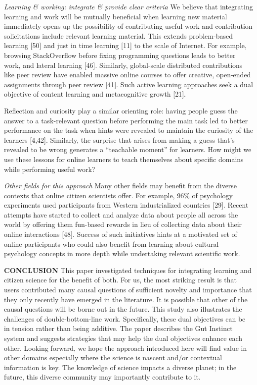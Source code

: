 \textit{Learning \& working: integrate \& provide clear criteria}
We believe that integrating learning and work will be mutually beneficial when learning new material immediately opens up the possibility of contributing useful work and contribution solicitations include relevant learning material. This extends problem-based learning [50] and just in time learning [11] to the scale of Internet. For example, browsing StackOverflow before fixing programming questions leads to better work, and lateral learning [46]. Similarly, global-scale distributed contributions like peer review have enabled massive online courses to offer creative, open-ended assignments through peer review [41]. Such active learning approaches seek a dual objective of content learning and metacognitive growth [21].
 
Reflection and curiosity play a similar orienting role: having people guess the answer to a task-relevant question before performing the main task led to better performance on the task when hints were revealed to maintain the curiosity of the learners [4,42]. Similarly, the surprise that arises from making a guess that’s revealed to be wrong generates a “teachable moment” for learners. How might we use these lessons for online learners to teach themselves about specific domains while performing useful work? 

\textit{Other fields for this approach}
Many other fields may benefit from the diverse contexts that online citizen scientists offer. For example, 96\% of psychology experiments used participants from Western industrialized countries [29]. Recent attempts have started to collect and analyze data about people all across the world by offering them fun-based rewards in lieu of collecting data about their online interactions [48]. Success of such initiatives hints at a motivated set of online participants who could also benefit from learning about cultural psychology concepts in more depth while undertaking relevant scientific work. 

\textbf{CONCLUSION}
This paper investigated techniques for integrating learning and citizen science for the benefit of both. For us, the most striking result is that users contributed many causal questions of sufficient novelty and importance that they only recently have emerged in the literature. It is possible that other of the causal questions will be borne out in the future. This study also illustrates the challenges of double-bottom-line work. Specifically, these dual objectives can be in tension rather than being additive. The paper describes the Gut Instinct system and suggests strategies that may help the dual objectives enhance each other. Looking forward, we hope the approach introduced here will find value in other domains especially where the science is nascent and/or contextual information is key. The knowledge of science impacts a diverse planet; in the future, this diverse community may importantly contribute to it.




